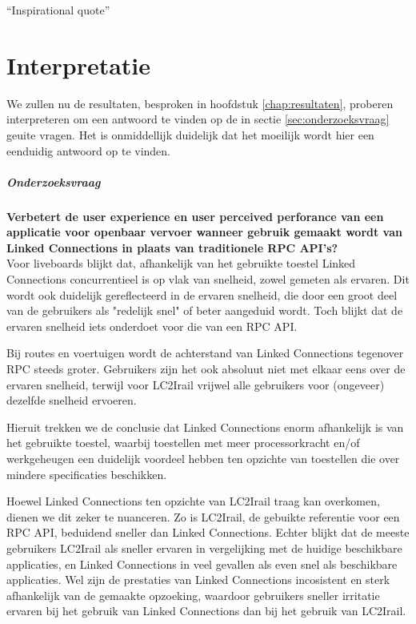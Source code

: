 \begin{savequote}[0.55\linewidth]
	``Inspirational quote''
\end{savequote}

\chapter{Interpretatie}
\label{chap:interpretatie}

We zullen nu de resultaten, besproken in hoofdstuk \ref{chap:resultaten}, proberen interpreteren om een antwoord te vinden op de in sectie \ref{sec:onderzoeksvraag} geuite vragen. Het is onmiddellijk duidelijk dat het moeilijk wordt hier een eenduidig antwoord op te vinden.

\paragraph{Onderzoeksvraag}  \textbf{Verbetert de user experience en user perceived perforance van een applicatie voor openbaar vervoer wanneer gebruik gemaakt wordt van Linked Connections in plaats van traditionele RPC API's?}\\

 Voor liveboards blijkt dat, afhankelijk van het gebruikte toestel Linked Connections concurrentieel is op vlak van snelheid, zowel gemeten als ervaren. Dit wordt ook duidelijk gereflecteerd in de ervaren snelheid, die door een groot deel van de gebruikers als "redelijk snel" of beter aangeduid wordt. Toch blijkt dat de ervaren snelheid iets onderdoet voor die van een RPC API.

Bij routes en voertuigen wordt de achterstand van Linked Connections tegenover RPC steeds groter. Gebruikers zijn het ook absoluut niet met elkaar eens over de ervaren snelheid, terwijl voor LC2Irail vrijwel alle gebruikers voor (ongeveer) dezelfde snelheid ervoeren.

Hieruit trekken we de conclusie dat Linked Connections enorm afhankelijk is van het gebruikte toestel,  waarbij toestellen met meer processorkracht en/of werkgeheugen een duidelijk voordeel hebben ten opzichte van toestellen die over mindere specificaties beschikken.

Hoewel Linked Connections ten opzichte van LC2Irail traag kan overkomen, dienen we dit zeker te nuanceren. Zo is LC2Irail, de gebuikte referentie voor een RPC API, beduidend sneller dan Linked Connections. Echter blijkt dat de meeste gebruikers LC2Irail als sneller ervaren in vergelijking met de huidige beschikbare applicaties, en Linked Connections in veel gevallen als even snel als beschikbare applicaties. Wel zijn de prestaties van Linked Connections incosistent en sterk afhankelijk van de gemaakte opzoeking, waardoor gebruikers sneller irritatie ervaren bij het gebruik van Linked Connections dan bij het gebruik van LC2Irail.

